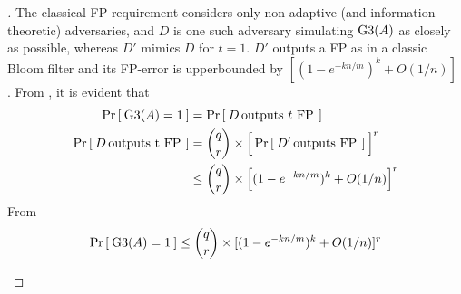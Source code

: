 \begin{proof}[]
\noindent
The classical FP requirement considers only non-adaptive (and information-theoretic) adversaries, and $D$ is one such adversary simulating $\text{G3}(A)$ as closely as possible, whereas $D'$ mimics $D$ for $t=1$. $D'$ outputs a FP as in a classic Bloom filter and its FP-error is upperbounded by $[(1-e^{-kn/m})^k +O(1/n)]$ \cite{KirschMitzenmacher}.  %
From , it is evident that
\begin{align}
\Pr\left[\: \text{G3}(A)=1 \:\right] &= \Pr\left[\: D \, \mbox{outputs $t$ FP} \, \:\right]\label{eq:4a}\\
\nonumber \Pr\left[\: D \, \mbox{outputs t FP} \, \:\right] &= \dbinom{q}{r}\times \Big[\Pr\left[\: D' \, \mbox{outputs FP} \, \:\right]\Big]^r\\
& \leq \dbinom{q}{r}\times \Big[(1-e^{-kn/m})^k +O(1/n)\Big]^r \label{eq:4b}
\end{align}
From 
\begin{equation}
\Pr\left[\: \text{G3}(A)=1 \:\right] \leq \dbinom{q}{r}\times [(1-e^{-kn/m})^k +O(1/n)]^r \label{eq:4}
\end{equation}
\begin{figure}
\centering
{}
\end{figure}
\end{proof}
